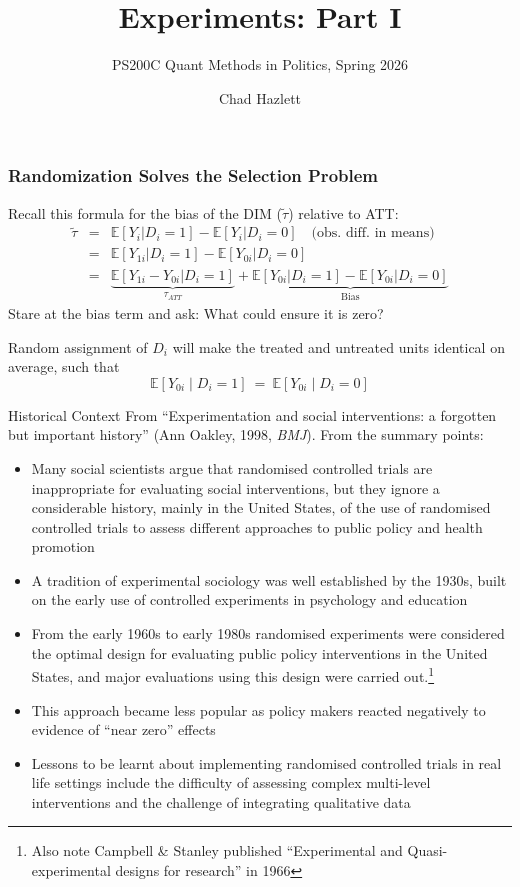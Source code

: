 \documentclass[xcolor=dvipsnames]{beamer}
\title[]{Experiments: Part I}
\subtitle[ ]{PS200C Quant Methods in Politics, Spring 2026}
\author[Hazlett]{Chad Hazlett }
\institute[UCLA]{UCLA\\[1ex]
  \texttt{chazlett@ucla.edu}
}
\date{}
\newcommand\E{\mathbb{E}}
\begin{document}
\begin{frame}
  \titlepage
\end{frame}


\begin{frame}
  \frametitle{Randomization Solves the Selection Problem}
  \small
Recall this formula for the bias of the DIM ($\tilde{\tau}$) relative to ATT:
\begin{eqnarray*}
\tilde{\tau} & = & \E[Y_i|D_i=1]-\E[Y_i|D_i=0] \quad \text{(obs. diff. in means)} \\
 & = & \E[Y_{1i} | D_i=1]-\E[Y_{0i} | D_i=0] \\
 & = & \underbrace{\E[Y_{1i} - Y_{0i} | D_i=1]}_{\tau_{ATT}}
                 +\underbrace{\E[Y_{0i} | D_i=1]-\E[Y_{0i} | D_i=0]}_{\mbox{Bias}}
\end{eqnarray*}
\pause
Stare at the bias term and ask: What could ensure it is zero?
\pause
\medskip

\alert{Random assignment} of $D_i$ will make the treated and untreated units identical on average, such that
$$ \E[Y_{0i}\mid D_i=1] \ = \ \E[Y_{0i}\mid D_i=0] $$

\end{frame}


\begin{frame}{Historical Context}
\small
From ``Experimentation and social interventions: a forgotten but important history'' (Ann Oakley, 1998, \textit{BMJ}). From the summary points:

\footnotesize
\begin{itemize}

\item<1-> Many social scientists argue that randomised controlled trials are inappropriate for evaluating social interventions, but they ignore a considerable history, mainly in the United States, of the use of randomised controlled trials to assess different approaches to public policy and health promotion

\item<2-> A tradition of experimental sociology was well established by the 1930s, built on the early use of controlled experiments in psychology and education

\item<3-> From the early 1960s to early 1980s randomised experiments were considered the optimal design for evaluating public policy interventions in the United States, and major evaluations using this design were carried out.\footnote{Also note Campbell \& Stanley published ``Experimental and Quasi-experimental designs for research'' in 1966}

\item<4-> This approach became less popular as policy makers reacted negatively to evidence of ``near zero'' effects

\item<5-> Lessons to be learnt about implementing randomised controlled trials in real life settings include the difficulty of assessing complex multi-level interventions and the challenge of integrating qualitative data

\end{itemize}
\end{frame}
\end{document}
